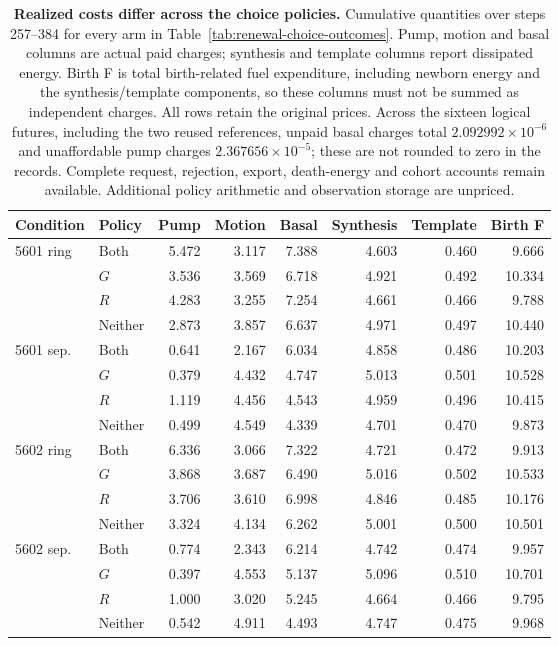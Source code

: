 \begin{table}[p]
\centering
\small
\setlength{\tabcolsep}{4pt}
\begin{tabular}{llrrrrrr}
\toprule
Condition & Policy & Pump & Motion & Basal & Synthesis & Template & Birth F \\
\midrule
5601 ring & Both & 5.472 & 3.117 & 7.388 & 4.603 & 0.460 & 9.666 \\
 & $G$ & 3.536 & 3.569 & 6.718 & 4.921 & 0.492 & 10.334 \\
 & $R$ & 4.283 & 3.255 & 7.254 & 4.661 & 0.466 & 9.788 \\
 & Neither & 2.873 & 3.857 & 6.637 & 4.971 & 0.497 & 10.440 \\
\midrule
5601 sep. & Both & 0.641 & 2.167 & 6.034 & 4.858 & 0.486 & 10.203 \\
 & $G$ & 0.379 & 4.432 & 4.747 & 5.013 & 0.501 & 10.528 \\
 & $R$ & 1.119 & 4.456 & 4.543 & 4.959 & 0.496 & 10.415 \\
 & Neither & 0.499 & 4.549 & 4.339 & 4.701 & 0.470 & 9.873 \\
\midrule
5602 ring & Both & 6.336 & 3.066 & 7.322 & 4.721 & 0.472 & 9.913 \\
 & $G$ & 3.868 & 3.687 & 6.490 & 5.016 & 0.502 & 10.533 \\
 & $R$ & 3.706 & 3.610 & 6.998 & 4.846 & 0.485 & 10.176 \\
 & Neither & 3.324 & 4.134 & 6.262 & 5.001 & 0.500 & 10.501 \\
\midrule
5602 sep. & Both & 0.774 & 2.343 & 6.214 & 4.742 & 0.474 & 9.957 \\
 & $G$ & 0.397 & 4.553 & 5.137 & 5.096 & 0.510 & 10.701 \\
 & $R$ & 1.000 & 3.020 & 5.245 & 4.664 & 0.466 & 9.795 \\
 & Neither & 0.542 & 4.911 & 4.493 & 4.747 & 0.475 & 9.968 \\
\bottomrule
\end{tabular}
\caption{\textbf{Realized costs differ across the choice policies.} Cumulative quantities over steps 257--384 for every arm in Table~\ref{tab:renewal-choice-outcomes}. Pump, motion and basal columns are actual paid charges; synthesis and template columns report dissipated energy. Birth F is total birth-related fuel expenditure, including newborn energy and the synthesis/template components, so these columns must not be summed as independent charges. All rows retain the original prices. Across the sixteen logical futures, including the two reused references, unpaid basal charges total $2.092992\times10^{-6}$ and unaffordable pump charges $2.367656\times10^{-5}$; these are not rounded to zero in the records. Complete request, rejection, export, death-energy and cohort accounts remain available. Additional policy arithmetic and observation storage are unpriced.}
\label{tab:renewal-choice-costs}
\end{table}
